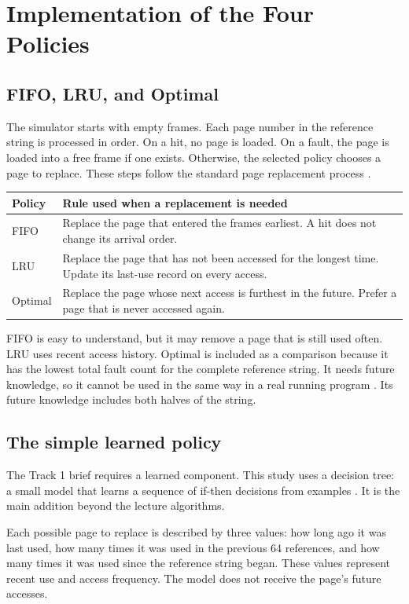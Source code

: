 \documentclass[11pt,a4paper]{article}
\begin{document}
\newpage
\section{Implementation of the Four Policies}
\subsection{FIFO, LRU, and Optimal}
The simulator starts with empty frames. Each page number in the reference string
is processed in order. On a hit, no page is loaded. On a fault, the page is loaded
into a free frame if one exists. Otherwise, the selected policy chooses a page to
replace. These steps follow the standard page replacement process \cite{ostep}.

\begin{center}
\begin{tabular}{|p{2cm}|p{10.8cm}|}\hline
Policy & Rule used when a replacement is needed \\ \hline
FIFO & Replace the page that entered the frames earliest. A hit does not change its arrival order. \\ \hline
LRU & Replace the page that has not been accessed for the longest time. Update its last-use record on every access. \\ \hline
Optimal & Replace the page whose next access is furthest in the future. Prefer a page that is never accessed again. \\ \hline
\end{tabular}
\end{center}

FIFO is easy to understand, but it may remove a page that is still used often.
LRU uses recent access history. Optimal is included as a comparison because it
has the lowest total fault count for the complete reference string. It needs
future knowledge, so it cannot be used in the same way in a real running program
\cite{cornell}. Its future knowledge includes both halves of the string.

\subsection{The simple learned policy}
The Track 1 brief requires a learned component. This study uses a decision tree:
a small model that learns a sequence of if-then decisions from examples
\cite{sklearn}. It is the main addition beyond the lecture algorithms.

Each possible page to replace is described by three values: how long ago it was
last used, how many times it was used in the previous 64 references, and how many
times it was used since the reference string began. These values represent recent use and
access frequency. The model does not receive the page's future accesses.
\end{document}
